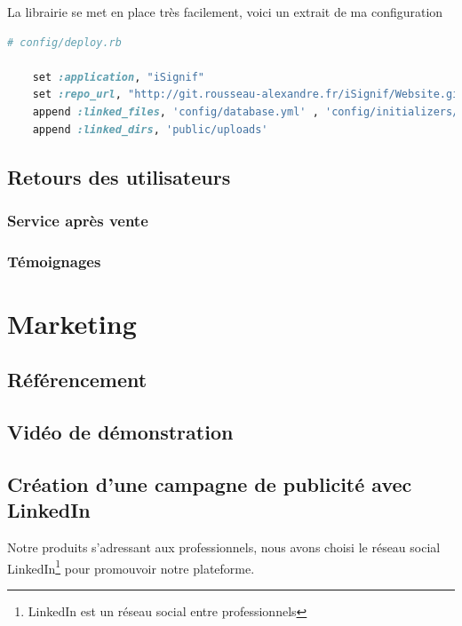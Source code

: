 \documentclass[]{report}
\begin{document}
    La librairie se met en place très facilement, voici un extrait de ma configuration

    \begin{scriptsize}
    \begin{lstlisting}[language=ruby]
    # config/deploy.rb

    set :application, "iSignif"
    set :repo_url, "http://git.rousseau-alexandre.fr/iSignif/Website.git"
    append :linked_files, 'config/database.yml' , 'config/initializers/secret_token.rb', 'config/secrets.yml'
    append :linked_dirs, 'public/uploads'
    \end{lstlisting}
    \end{scriptsize}

  \section{Retours des utilisateurs}\label{sec:feedback}

    \subsection{Service après vente}


    \subsection{Témoignages}


\chapter{Marketing}

  \section{Référencement}

  \section{Vidéo de démonstration}

  \section{Création d'une campagne de publicité avec LinkedIn}

    Notre produits s’adressant aux professionnels, nous avons choisi le réseau social LinkedIn\footnote{LinkedIn est un réseau social entre professionnels} pour promouvoir notre plateforme.
\end{document}
